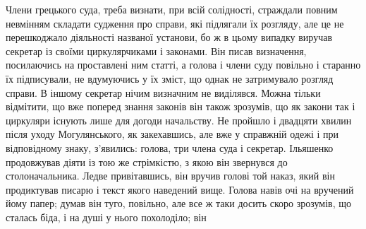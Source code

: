 \documentclass[a4paper,20pt]{report}
\begin{document}
Члени грецького суда, треба визнати, при всій солідності, страждали повним
невмінням складати судження про справи, які підлягали їх розгляду, але це не
перешкоджало діяльності названої установи, бо ж в цьому випадку виручав
секретар із своїми циркулярчиками і законами.  Він писав визначення,
посилаючись на проставлені ним статті, а голова і члени суду повільно і
старанно їх підписували, не вдумуючись у їх зміст, що однак не затримувало
розгляд справи. В іншому секретар нічим визначним не виділявся. Можна тільки
відмітити, що вже поперед знання законів він також зрозумів, що як закони так і
циркуляри існують лише для догоди начальству.
Не пройшло і двадцяти хвилин після уходу Могулянського, як закехавшись, але вже
у справжній одежі і при відповідному знаку, з'явились: голова, три члена суда і
секретар. Ільяшенко продовжував діяти із тою же стрімкістю, з якою він
звернувся до столоначальника.  Ледве привітавшись, він вручив голові той наказ,
який він продиктував писарю і текст якого наведений вище.
Голова навів очі на вручений йому папер; думав він туго, повільно, але все ж
таки досить скоро зрозумів, що сталась біда, і на душі у нього похолоділо; він
\end{document}
